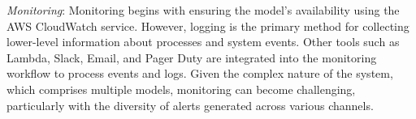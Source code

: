 \textit{Monitoring}: Monitoring begins with ensuring the model's availability using the AWS CloudWatch service. However, logging is the primary method for collecting lower-level information about processes and system events. Other tools such as Lambda, Slack, Email, and Pager Duty are integrated into the monitoring workflow to process events and logs. Given the complex nature of the system, which comprises multiple models, monitoring can become challenging, particularly with the diversity of alerts generated across various channels.

